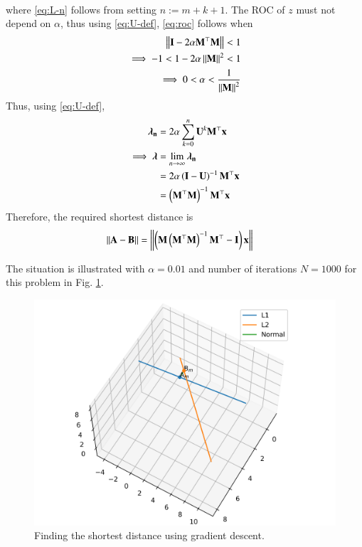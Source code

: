 \documentclass[journal,12pt,twocolumn]{IEEEtran}
\renewcommand{\vec}[1]{\boldsymbol{\mathbf{#1}}}
\begin{document}
\begin{enumerate}
\begin{align}
    \end{align}
    where \eqref{eq:L-n} follows from setting $n := m + k + 1$. The ROC of $z$ must
    not depend on $\alpha$, thus using \eqref{eq:U-def}, \eqref{eq:roc} follows when
    \begin{align}
        \norm{\vec{I}-2\alpha\vec{M}^\top\vec{M}} < 1 \\
        \implies -1 < 1 - 2\alpha\norm{\vec{M}}^2 < 1 \\
        \implies 0 < \alpha < \frac{1}{\norm{\vec{M}}^2}
        \label{eq:alpha-cond}
    \end{align}
    Thus, using \eqref{eq:U-def},
    \begin{align}
        \vec{\lambda_n} &= 2\alpha\sum_{k=0}^{n}\vec{U}^k\vec{M}^\top\vec{x} \\
        \implies \vec{\lambda} &= \lim_{n\to\infty}\vec{\lambda_n} \\
                               &= 2\alpha\brak{\vec{I}-\vec{U}}^{-1}\vec{M}^\top\vec{x} \\
                               &= \brak{\vec{M}^\top\vec{M}}^{-1}\vec{M}^\top\vec{x}
                               \label{eq:lambda-sol}
    \end{align}
    Therefore, the required shortest distance is
    \begin{align}
        \norm{\vec{A}-\vec{B}} &= \norm{\brak{\vec{M}\brak{\vec{M}^\top\vec{M}}^{-1}\vec{M}^\top - \vec{I}}\vec{x}} 
        \label{eq:dist-skew}
    \end{align}

    The situation is illustrated with $\alpha = 0.01$ and number of iterations
    $N = 1000$ for this problem in Fig. \ref{fig:skew-gd}.
    \begin{figure}[!ht]
        \centering
        \includegraphics[width=\columnwidth]{figs/skew_gd.png}
        \caption{Finding the shortest distance using gradient descent.}
        \label{fig:skew-gd}
    \end{figure}
\end{enumerate}
\end{document}
